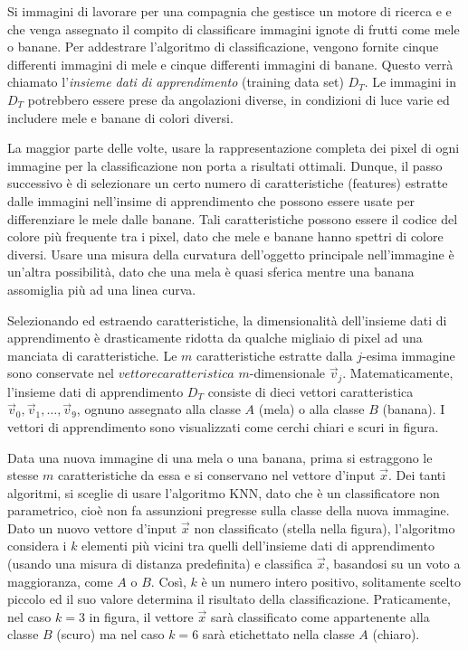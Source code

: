 Si immagini di lavorare per una compagnia che gestisce un motore di ricerca e 
e che venga assegnato il compito di classificare immagini ignote di frutti come 
mele o banane. Per addestrare l'algoritmo di classificazione, vengono fornite 
cinque differenti immagini di mele e cinque differenti immagini di banane. 
Questo verrà chiamato l'\emph{insieme dati di apprendimento} (training data set) 
$D_T$. Le immagini in $D_T$ potrebbero essere prese da angolazioni diverse, in 
condizioni di luce varie ed includere mele e banane di colori diversi. 

La maggior parte delle volte, usare la rappresentazione completa dei pixel di 
ogni immagine per la classificazione non porta a risultati ottimali. Dunque, il 
passo successivo è di selezionare un certo numero di caratteristiche (features) 
estratte dalle immagini nell'insime di apprendimento che possono essere usate per 
differenziare le mele dalle banane. Tali caratteristiche possono essere il codice 
del colore più frequente tra i pixel, dato che mele e banane hanno spettri di 
colore diversi. Usare una misura della curvatura dell'oggetto principale 
nell'immagine è un'altra possibilità, dato che una mela è quasi sferica mentre 
una banana assomiglia più ad una linea curva. 

Selezionando ed estraendo caratteristiche, la dimensionalità dell'insieme dati 
di apprendimento è drasticamente ridotta da qualche migliaio di pixel ad una 
manciata di caratteristiche. Le $m$ caratteristiche estratte dalla $j$-esima 
immagine sono conservate nel $vettore caratteristica$ $m$-dimensionale 
$\vec{v}_j$. Matematicamente, l'insieme dati di apprendimento $D_T$ consiste di 
dieci vettori caratteristica $\vec{v}_0, \vec{v}_1, \ldots, \vec{v}_9$, ognuno 
assegnato alla classe $A$ (mela) o alla classe $B$ (banana). I vettori di 
apprendimento sono visualizzati come cerchi chiari e scuri in figura. 


Data una nuova immagine di una mela o una banana, prima si estraggono le stesse 
$m$ caratteristiche da essa e si conservano nel vettore d'input $\vec{x}$. Dei 
tanti algoritmi, si sceglie di usare l'algoritmo \ac{KNN}, dato che è un 
classificatore non parametrico, cioè non fa assunzioni pregresse sulla classe 
della nuova immagine. Dato un nuovo vettore d'input $\vec{x}$ non classificato 
(stella nella figura), %
l'algoritmo considera i $k$ elementi più vicini tra quelli dell'insieme dati 
di apprendimento (usando una misura di distanza predefinita) e classifica 
$\vec{x}$, basandosi su un voto a maggioranza, come $A$ o $B$. Così, $k$ è un 
numero intero positivo, solitamente scelto piccolo ed il suo valore determina 
il risultato della classificazione. Praticamente, nel caso $k=3$ in figura, 
il vettore $\vec{x}$ sarà classificato come appartenente alla classe $B$ (scuro) 
ma nel caso $k=6$ sarà etichettato nella classe $A$ (chiaro). 

